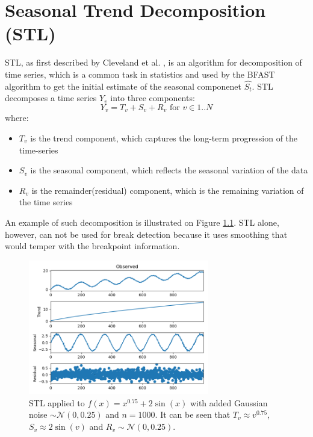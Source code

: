 \documentclass[main.tex]{subfiles}
\begin{document}
\chapter{Seasonal Trend Decomposition (STL)}
\label{chap:stl}
STL, as first described by Cleveland et al. \cite{stl}, is an
algorithm for decomposition of time series, which is a common task in
statistics and used by the BFAST algorithm to get the initial estimate of the
seasonal componenet $\hat{S_t}$.
STL decomposes a time series $Y_v$ into three components:
\[
Y_v = T_v + S_v + R_v \text{ for } v \in 1..N
\]
where:
\begin{itemize}
\item $T_v$ is the trend component, which captures the long-term progression of
  the time-series
\item $S_v$ is the seasonal component, which reflects the seasonal variation of
  the data
\item $R_v$ is the remainder(residual) component, which is the remaining variation of the time series
\end{itemize}
An example of such decomposition is illustrated on Figure \ref{fig_stl}.
STL alone, however, can not be used for break detection because it uses smoothing
that would temper with the breakpoint information.
\begin{figure}
  \centering
  \includegraphics[width=0.7\textwidth]{imgs/stl1}
  \caption{STL applied to $f(x) = x^{0.75} + 2\sin(x)$ with added Gaussian noise
    $\sim \mathcal{N}(0, 0.25)$ and $n = 1000$. It can be seen that
    $T_v \approx v^{0.75}$, $S_v \approx 2\sin(v)$ and $R_v \sim \mathcal{N}(0, 0.25)$. }
  \label{fig_stl}
\end{figure}
\end{document}
